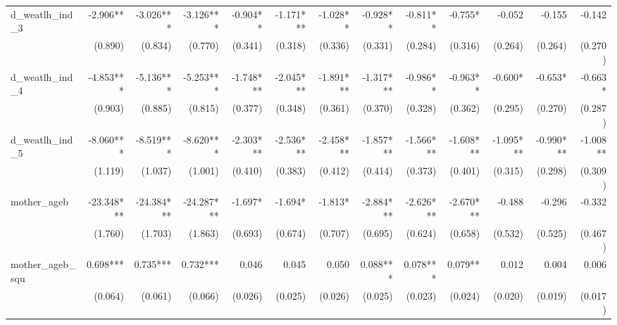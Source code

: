 \begin{tabular}{lrrrrrrrrrrrr}
d\_weatlh\_ind\_3                           &     -2.906** &    -3.026*** &    -3.126*** &     -0.904** &    -1.171*** &     -1.028** &     -0.928** &     -0.811** &      -0.755* &       -0.052 &       -0.155 &       -0.142 \\ 
                                            &      (0.890) &      (0.834) &      (0.770) &      (0.341) &      (0.318) &      (0.336) &      (0.331) &      (0.284) &      (0.316) &      (0.264) &      (0.264) &      (0.270) \\ 
d\_weatlh\_ind\_4                           &    -4.853*** &    -5.136*** &    -5.253*** &    -1.748*** &    -2.045*** &    -1.891*** &    -1.317*** &     -0.986** &     -0.963** &      -0.600* &      -0.653* &      -0.663* \\ 
                                            &      (0.903) &      (0.885) &      (0.815) &      (0.377) &      (0.348) &      (0.361) &      (0.370) &      (0.328) &      (0.362) &      (0.295) &      (0.270) &      (0.287) \\ 
d\_weatlh\_ind\_5                           &    -8.060*** &    -8.519*** &    -8.620*** &    -2.303*** &    -2.536*** &    -2.458*** &    -1.857*** &    -1.566*** &    -1.608*** &    -1.095*** &    -0.990*** &     -1.008** \\ 
                                            &      (1.119) &      (1.037) &      (1.001) &      (0.410) &      (0.383) &      (0.412) &      (0.414) &      (0.373) &      (0.401) &      (0.315) &      (0.298) &      (0.309) \\ 
mother\_ageb                                &   -23.348*** &   -24.384*** &   -24.287*** &      -1.697* &      -1.694* &      -1.813* &    -2.884*** &    -2.626*** &    -2.670*** &       -0.488 &       -0.296 &       -0.332 \\ 
                                            &      (1.760) &      (1.703) &      (1.863) &      (0.693) &      (0.674) &      (0.707) &      (0.695) &      (0.624) &      (0.658) &      (0.532) &      (0.525) &      (0.467) \\ 
mother\_ageb\_squ                           &     0.698*** &     0.735*** &     0.732*** &        0.046 &        0.045 &        0.050 &     0.088*** &     0.078*** &      0.079** &        0.012 &        0.004 &        0.006 \\ 
                                            &      (0.064) &      (0.061) &      (0.066) &      (0.026) &      (0.025) &      (0.026) &      (0.025) &      (0.023) &      (0.024) &      (0.020) &      (0.019) &      (0.017) \\ 

\end{tabular}
